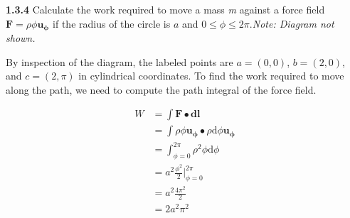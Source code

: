 \documentclass{article}
\begin{document}
\textbf{1.3.4} Calculate the work required to move a mass \textit{m} against a force field $\mathbf{F} =
	\rho\phi\mathbf{u_\phi}$ if the radius of the circle is $a$ and $0 \leq \phi \leq 2\pi$.\@ \textit{Note: Diagram not
	shown.}

\vspace{24pt}

By inspection of the diagram, the labeled points are $a = (0, 0)$, $b = (2, 0)$, and $c = (2, \pi)$ in cylindrical
coordinates. To find the work required to move along the path, we need to compute the path integral of the force field.

\begin{equation*}
	\begin{split}
		W & = \int \mathbf{F} \bullet \mathbf{dl} \\
		& = \int \rho \phi \mathbf{u_\phi} \bullet \rho \text{d}\phi \mathbf{u_\phi} \\
		& = \int_{\phi = 0}^{2\pi} \rho^2 \phi \text{d}\phi \\
		& = a^2 \frac{\phi^2}{2}\biggr\rvert_{\phi = 0}^{2\pi} \\
		& = a^2 \frac{4\pi^2}{2} \\
		& = 2a^2\pi^2
	\end{split}
\end{equation*}
\end{document}
